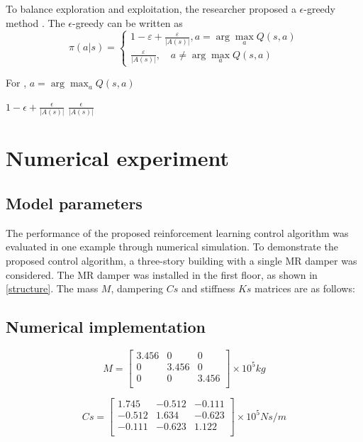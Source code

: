 To balance exploration and exploitation, the researcher proposed a $\epsilon$-greedy method \citep{}. The $\epsilon$-greedy can be written as
\begin{equation}
\pi(a | s)=\left\{\begin{array}{c}
{1-\varepsilon+\frac{\varepsilon}{|A(s)|}, a=\arg \max _{a} Q(s, a)} \\
{\frac{\varepsilon}{|A(s)|}, \quad a \neq \arg \max _{a} Q(s, a)}
\end{array}\right.
\end{equation}

For ,
$a=\arg \max _{a} Q(s, a)$

$1- \epsilon + \frac{\epsilon}{|A(s)|}$
$\frac{\epsilon}{|A(s)|}$

\section{Numerical experiment}
\subsection{Model parameters}
The performance of the proposed reinforcement learning control algorithm was evaluated in one example through numerical simulation. To demonstrate the proposed control algorithm, a three-story building with a single MR damper was considered. The MR damper was installed in the first floor, as shown in \ref{structure}. The mass $M$, dampering $Cs$ and stiffness $Ks$ matrices are as follows:
\subsection{Numerical implementation}
\begin{equation}       
M=\left[                 
  \begin{array}{ccc}   
   3.456 & 0 & 0 \\  
    0 & 3.456 & 0 \\ 
   0 & 0 &  3.456 \\
  \end{array}
\right]     
\times 10^{5} kg        
\end{equation}

\begin{equation}       
Cs=\left[                 
  \begin{array}{ccc}   
    1.745 & -0.512 & -0.111\\
    -0.512 & 1.634 & -0.623 \\
    -0.111 & -0.623 & 1.122 \\
  \end{array}
\right]     
\times 10^{5} N s/m        
\end{equation}

